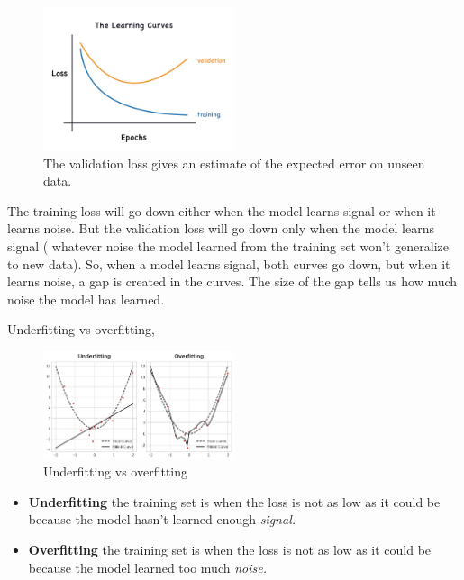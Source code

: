 \begin{figure}[htp]
	\centering
	\includegraphics[width=0.5\textwidth]{../assets/machine_learning_random/signal_vs_noise.png}
	\caption{The validation loss gives an estimate of the expected error on unseen data.}
\end{figure}

\noindent The training loss will go down either when the model learns signal or when it
learns noise. But the validation loss will go down only when the model learns signal (
whatever noise the model learned from the training set won't generalize to new data). So,
when a model learns signal, both curves go down, but when it learns noise, a gap is created
in the curves. The size of the gap tells us how much noise the model has learned.

\noindent Underfitting vs overfitting,

\begin{figure}[htp]
	\centering
	\includegraphics[width=0.5\textwidth]{../assets/machine_learning_random/underfitting_vs_overfitting.png}
	\caption{Underfitting vs overfitting}
\end{figure}

\begin{itemize}
	\item \textbf{Underfitting} the training set is when the loss is not as
		low as it could be because the model hasn't learned enough \emph{signal.}
	\item \textbf{Overfitting} the training set is when the loss is not as low
		as it could be because the model learned too much \emph{noise.}
\end{itemize}

